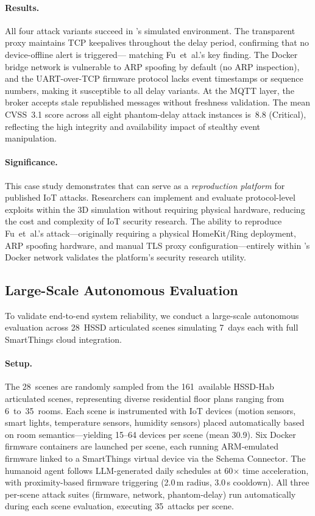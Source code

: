 \paragraph{Results.}
All four attack variants succeed in \sys{}'s simulated environment.
The transparent proxy maintains TCP keepalives throughout the delay
period, confirming that no device-offline alert is triggered---
matching Fu~et~al.'s key finding.  The Docker bridge network is
vulnerable to ARP spoofing by default (no ARP inspection),
and the UART-over-TCP firmware protocol lacks event timestamps
or sequence numbers, making it susceptible to all delay variants.
At the MQTT layer, the broker accepts stale republished messages
without freshness validation.  The mean CVSS~3.1 score across
all eight phantom-delay attack instances is~8.8 (Critical),
reflecting the high integrity and availability impact of stealthy
event manipulation.

\paragraph{Significance.}
This case study demonstrates that \sys{} can serve as a
\emph{reproduction platform} for published IoT attacks.
Researchers can implement and evaluate protocol-level exploits
within the 3D simulation without requiring physical hardware,
reducing the cost and complexity of IoT security research.
The ability to reproduce Fu~et~al.'s attack---originally requiring
a physical HomeKit/Ring deployment, ARP spoofing hardware, and
manual TLS proxy configuration---entirely within \sys{}'s
Docker network validates the platform's security research utility.

\subsection{Large-Scale Autonomous Evaluation}\label{sec:eval-autonomous}

To validate end-to-end system reliability, we conduct a large-scale
autonomous evaluation across 28~HSSD articulated scenes simulating
7~days each with full SmartThings cloud integration.

\paragraph{Setup.}
The 28~scenes are randomly sampled from the 161~available HSSD-Hab
articulated scenes, representing diverse residential floor plans
ranging from 6~to~35~rooms.  Each scene is instrumented with IoT
devices (motion sensors, smart lights, temperature sensors, humidity
sensors) placed automatically based on room semantics---yielding
15--64 devices per scene (mean 30.9).  Six Docker
firmware containers are launched per scene, each running ARM-emulated
firmware linked to a SmartThings virtual device via the Schema
Connector.  The humanoid agent follows LLM-generated daily schedules
at 60$\times$ time acceleration, with proximity-based firmware
triggering (2.0\,m radius, 3.0\,s cooldown).
All three per-scene attack suites (firmware, network, phantom-delay)
run automatically during each scene evaluation, executing 35~attacks
per scene.

